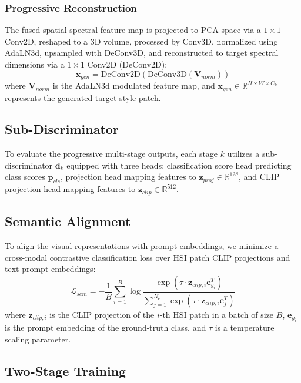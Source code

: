 \subsubsection{Progressive Reconstruction}
The fused spatial-spectral feature map is projected to PCA space via a $1 \times 1$ Conv2D, reshaped to a 3D volume, processed by Conv3D, normalized using AdaLN3d, upsampled with DeConv3D, and reconstructed to target spectral dimensions via a $1 \times 1$ Conv2D (DeConv2D):
\begin{equation}
\mathbf{x}_{gen} = \text{DeConv2D}\left(\text{DeConv3D}\left(\mathbf{V}_{norm}\right)\right)
\end{equation}
where $\mathbf{V}_{norm}$ is the AdaLN3d modulated feature map, and $\mathbf{x}_{gen} \in \mathbb{R}^{H \times W \times C_k}$ represents the generated target-style patch.

\subsection{Sub-Discriminator}
To evaluate the progressive multi-stage outputs, each stage $k$ utilizes a sub-discriminator $\mathbf{d}_k$ equipped with three heads: classification score head predicting class scores $\mathbf{p}_{cls}$, projection head mapping features to $\mathbf{z}_{proj} \in \mathbb{R}^{128}$, and CLIP projection head mapping features to $\mathbf{z}_{clip} \in \mathbb{R}^{512}$.

\subsection{Semantic Alignment}
To align the visual representations with prompt embeddings, we minimize a cross-modal contrastive classification loss over HSI patch CLIP projections and text prompt embeddings:
\begin{equation}
\mathcal{L}_{sem} = -\frac{1}{B} \sum_{i=1}^B \log \frac{\exp\left(\tau \cdot \mathbf{z}_{clip, i} \mathbf{e}_{y_i}^T\right)}{\sum_{j=1}^{N_c} \exp\left(\tau \cdot \mathbf{z}_{clip, i} \mathbf{e}_j^T\right)}
\end{equation}
where $\mathbf{z}_{clip, i}$ is the CLIP projection of the $i$-th HSI patch in a batch of size $B$, $\mathbf{e}_{y_i}$ is the prompt embedding of the ground-truth class, and $\tau$ is a temperature scaling parameter.

\subsection{Two-Stage Training}
